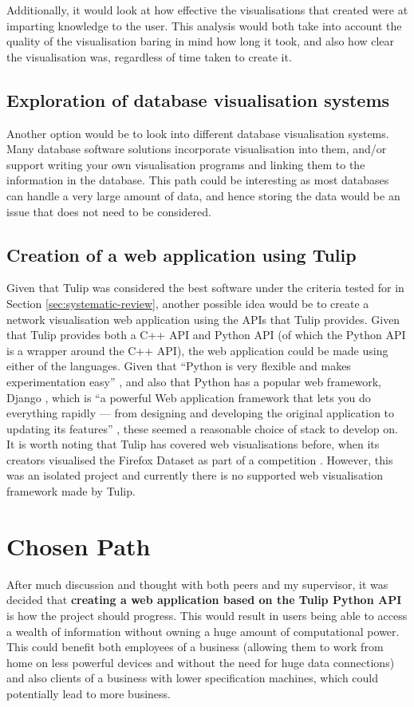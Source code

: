 \documentclass[../dissertation.tex]{subfiles}
\begin{document}
Additionally, it would look at how effective the visualisations that created were at imparting knowledge to the user. This analysis would both take into account the quality of the visualisation baring in mind how long it took, and also how clear the visualisation was, regardless of time taken to create it. 

\subsection{Exploration of database visualisation systems}

Another option would be to look into different database visualisation systems. Many database software solutions incorporate visualisation into them, and/or support writing your own visualisation programs and linking them to the information in the database. This path could be interesting as most databases can handle a very large amount of data, and hence storing the data would be an issue that does not need to be considered. 

\subsection{Creation of a web application using Tulip}

Given that Tulip was considered the best software under the criteria tested for in Section \ref{sec:systematic-review}, another possible idea would be to create a network visualisation web application using the APIs that Tulip provides. Given that Tulip provides both a C++ API \cite{tulipcppapi} and Python API \cite{tulippyapi} (of which the Python API is a wrapper around the C++ API), the web application could be made using either of the languages. Given that ``Python is very flexible and makes experimentation easy'' \cite{zelle2004python}, and also that Python has a popular web framework, Django \cite{django}, which is ``a powerful Web application framework that lets you do everything rapidly — from designing and developing the original application to updating its features'' \cite{forcier2008python}, these seemed a reasonable choice of stack to develop on. It is worth noting that Tulip has covered web visualisations before, when its creators visualised the Firefox Dataset as part of a competition \cite{tulipfirefox}. However, this was an isolated project and currently there is no supported web visualisation framework made by Tulip.

\section{Chosen Path}

After much discussion and thought with both peers and my supervisor, it was decided that \textbf{creating a web application based on the Tulip Python API} is how the project should progress. This would result in users being able to access a wealth of information without owning a huge amount of computational power. This could benefit both employees of a business (allowing them to work from home on less powerful devices and without the need for huge data connections) and also clients of a business with lower specification machines, which could potentially lead to more business.
\end{document}
